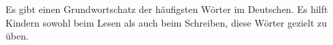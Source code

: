 Es gibt einen Grundwortschatz der häufigsten Wörter im Deutschen.
Es hilft Kindern sowohl beim Lesen als auch beim Schreiben, diese Wörter gezielt zu üben.